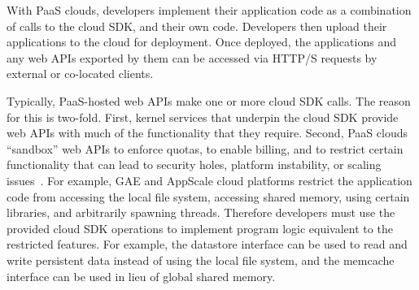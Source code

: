 

With PaaS clouds, developers implement their application code as a combination of calls to the
cloud SDK, and their own code. Developers then
upload their applications to the cloud for deployment.
Once deployed, the applications and any web APIs exported by them can be accessed 
via HTTP/S requests by external or co-located clients.

Typically, PaaS-hosted web APIs make one or more cloud SDK calls.
The reason for this is two-fold. First, 
kernel services that underpin the cloud SDK provide web APIs with much of the functionality that they require.
Second, PaaS clouds ``sandbox'' web APIs to enforce quotas, to enable billing,
and to restrict certain functionality
that can lead to security holes, platform instability, or scaling issues~\cite{gae-sandbox}.
For example, GAE and AppScale cloud platforms restrict the application code
from accessing the local file system, accessing shared memory, using certain libraries,
and arbitrarily spawning threads. Therefore developers must use the provided cloud 
SDK operations to implement program logic equivalent to the restricted features. For
example, the datastore interface can be used to read and write persistent data instead of 
using the local file system, and the memcache interface can be used in lieu of global
shared memory.

